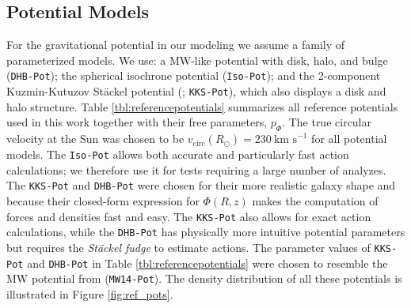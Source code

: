 \documentclass[iop,revtex4,numberedappendix,appendixfloats]{emulateapj}
\begin{document}
\newpage
\subsection{Potential Models} \label{sec:potentials}

For the gravitational potential in our modeling we assume a family of parameterized models. We use: a MW-like potential with disk, halo, and bulge (\texttt{DHB-Pot}); the spherical isochrone potential (\texttt{Iso-Pot}); and the 2-component Kuzmin-Kutuzov St\"{a}ckel potential (\citealt{1994AA...287...43B}; \texttt{KKS-Pot}), which also displays a disk and halo structure. Table \ref{tbl:referencepotentials} summarizes all reference potentials used in this work together with their free parameters, $p_\Phi$. The true circular velocity at the Sun was chosen to be $v_\text{circ}(R_\odot)=230~\text{km s}^{-1}$ for all potential models. The \texttt{Iso-Pot} allows both accurate and particularly fast action calculations; we therefore use it for tests requiring a large number of analyzes. The \texttt{KKS-Pot} and \texttt{DHB-Pot} were chosen for their more realistic galaxy shape and because their closed-form expression for $\Phi(R,z)$ makes the computation of forces and densities fast and easy. The \texttt{KKS-Pot} also allows for exact action calculations, while the \texttt{DHB-Pot} has physically more intuitive potential parameters but requires the \emph{St\"{a}ckel fudge} to estimate actions. The parameter values of \texttt{KKS-Pot} and \texttt{DHB-Pot} in Table \ref{tbl:referencepotentials} were chosen to resemble the MW potential from \citet{2015ApJS..216...29B} (\texttt{MW14-Pot}). The density distribution of all these potentials is illustrated in Figure \ref{fig:ref_pots}. 

\end{document}
